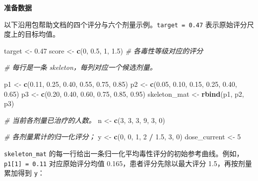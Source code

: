 \documentclass[
  chinese,
]{article}
\newenvironment{Shaded}{\begin{snugshade}}{\end{snugshade}}
\newcommand{\CommentTok}[1]{\textcolor[rgb]{0.56,0.35,0.01}{\textit{#1}}}
\newcommand{\DecValTok}[1]{\textcolor[rgb]{0.00,0.00,0.81}{#1}}
\newcommand{\FloatTok}[1]{\textcolor[rgb]{0.00,0.00,0.81}{#1}}
\newcommand{\FunctionTok}[1]{\textcolor[rgb]{0.13,0.29,0.53}{\textbf{#1}}}
\newcommand{\NormalTok}[1]{#1}
\newcommand{\OtherTok}[1]{\textcolor[rgb]{0.56,0.35,0.01}{#1}}
\newcommand{\SpecialCharTok}[1]{\textcolor[rgb]{0.81,0.36,0.00}{\textbf{#1}}}
\begin{document}
\textbf{准备数据}

以下沿用包帮助文档的四个评分与六个剂量示例。\texttt{target\ =\ 0.47}
表示原始评分尺度上的目标均值。

\begin{Shaded}
\begin{Highlighting}[]
\NormalTok{target }\OtherTok{\textless{}{-}} \FloatTok{0.47}
\NormalTok{score }\OtherTok{\textless{}{-}} \FunctionTok{c}\NormalTok{(}\DecValTok{0}\NormalTok{, }\FloatTok{0.5}\NormalTok{, }\DecValTok{1}\NormalTok{, }\FloatTok{1.5}\NormalTok{)  }\CommentTok{\# 各毒性等级对应的评分}

\CommentTok{\# 每行是一条 skeleton，每列对应一个候选剂量。}

\NormalTok{p1 }\OtherTok{\textless{}{-}} \FunctionTok{c}\NormalTok{(}\FloatTok{0.11}\NormalTok{, }\FloatTok{0.25}\NormalTok{, }\FloatTok{0.40}\NormalTok{, }\FloatTok{0.55}\NormalTok{, }\FloatTok{0.75}\NormalTok{, }\FloatTok{0.85}\NormalTok{)}
\NormalTok{p2 }\OtherTok{\textless{}{-}} \FunctionTok{c}\NormalTok{(}\FloatTok{0.05}\NormalTok{, }\FloatTok{0.10}\NormalTok{, }\FloatTok{0.15}\NormalTok{, }\FloatTok{0.25}\NormalTok{, }\FloatTok{0.40}\NormalTok{, }\FloatTok{0.65}\NormalTok{)}
\NormalTok{p3 }\OtherTok{\textless{}{-}} \FunctionTok{c}\NormalTok{(}\FloatTok{0.20}\NormalTok{, }\FloatTok{0.40}\NormalTok{, }\FloatTok{0.60}\NormalTok{, }\FloatTok{0.75}\NormalTok{, }\FloatTok{0.85}\NormalTok{, }\FloatTok{0.95}\NormalTok{)}
\NormalTok{skeleton\_mat }\OtherTok{\textless{}{-}} \FunctionTok{rbind}\NormalTok{(p1, p2, p3)}

\CommentTok{\# 当前各剂量已治疗的人数。}
\NormalTok{n }\OtherTok{\textless{}{-}} \FunctionTok{c}\NormalTok{(}\DecValTok{3}\NormalTok{, }\DecValTok{3}\NormalTok{, }\DecValTok{3}\NormalTok{, }\DecValTok{9}\NormalTok{, }\DecValTok{3}\NormalTok{, }\DecValTok{0}\NormalTok{)}

\CommentTok{\# 各剂量累计的归一化评分；}
\NormalTok{y }\OtherTok{\textless{}{-}} \FunctionTok{c}\NormalTok{(}\DecValTok{0}\NormalTok{, }\DecValTok{0}\NormalTok{, }\DecValTok{1}\NormalTok{, }\DecValTok{2} \SpecialCharTok{/} \FloatTok{1.5}\NormalTok{, }\DecValTok{3}\NormalTok{, }\DecValTok{0}\NormalTok{)}
\NormalTok{dose\_current }\OtherTok{\textless{}{-}} \DecValTok{5}
\end{Highlighting}
\end{Shaded}

\texttt{skeleton\_mat}
的每一行给出一条归一化平均毒性评分的初始参考曲线。例如，\texttt{p1{[}1{]}\ =\ 0.11}
对应原始评分均值 0.165，患者评分先除以最大评分 1.5，再按剂量累加得到
\texttt{y}：
\end{document}
